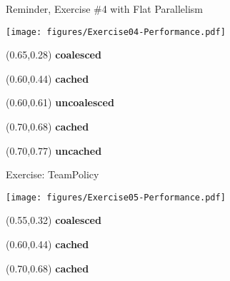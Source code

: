 \begin{frame}[fragile]{Reminder, Exercise \#4 with Flat Parallelism}

  \vspace{-10pt}

    \texttt{[image: figures/Exercise04-Performance.pdf]}

  \vspace{-15pt}

  \begin{textblock*}{0.5\textwidth}(0.65\textwidth,0.28\textheight)
    \textbf{coalesced}
  \end{textblock*}

  \begin{textblock*}{0.5\textwidth}(0.60\textwidth,0.44\textheight)
    \textbf{cached}
  \end{textblock*}

  \begin{textblock*}{0.5\textwidth}(0.60\textwidth,0.61\textheight)
    \textbf{uncoalesced}
  \end{textblock*}

  \begin{textblock*}{0.5\textwidth}(0.70\textwidth,0.68\textheight)
    \textbf{cached}
  \end{textblock*}

  \begin{textblock*}{0.5\textwidth}(0.70\textwidth,0.77\textheight)
    \textbf{uncached}
  \end{textblock*}

\end{frame}


\begin{frame}[fragile]{Exercise: TeamPolicy}

  \vspace{-10pt}

  \begin{center}
    \texttt{[image: figures/Exercise05-Performance.pdf]}
  \end{center}

  \vspace{-15pt}

  \begin{textblock*}{0.5\textwidth}(0.55\textwidth,0.32\textheight)
    \textbf{coalesced}
  \end{textblock*}

  \begin{textblock*}{0.5\textwidth}(0.60\textwidth,0.44\textheight)
    \textbf{cached}
  \end{textblock*}

  \begin{textblock*}{0.5\textwidth}(0.70\textwidth,0.68\textheight)
    \textbf{cached}
  \end{textblock*}

\end{frame}

